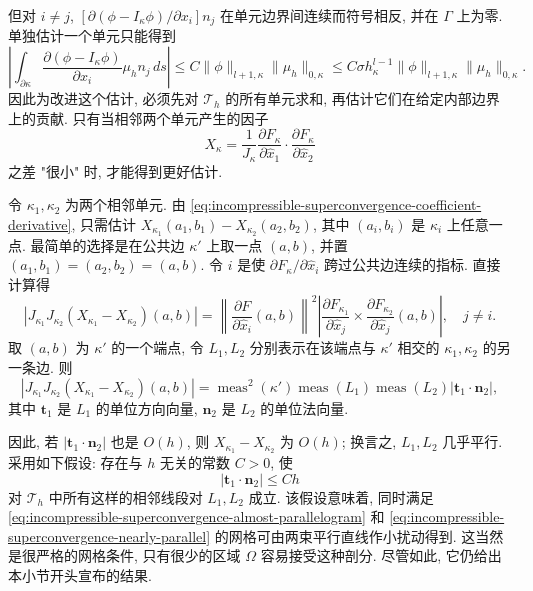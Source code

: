 但对 $i\ne j$,
$[\partial(\phi-I_\kappa\phi)/\partial x_i]n_j$
在单元边界间连续而符号相反, 并在 $\Gamma$ 上为零.
单独估计一个单元只能得到
\begin{equation}\label{eq:incompressible-superconvergence-crude-cross-bound}
\left|
\int_{\partial\kappa}
\frac{\partial(\phi-I_\kappa\phi)}{\partial x_i}
\mu_h n_j\,ds\right|
\leq C\|\phi\|_{l+1,\kappa}\|\mu_h\|_{0,\kappa}
\leq C\sigma h_\kappa^{l-1}
\|\phi\|_{l+1,\kappa}\|\mu_h\|_{0,\kappa}.
\end{equation}
因此为改进这个估计, 必须先对 $\mathcal T_h$ 的所有单元求和,
再估计它们在给定内部边界上的贡献.
只有当相邻两个单元产生的因子
\[
X_\kappa
=\frac1{J_\kappa}
\frac{\partial F_\kappa}{\partial\widehat x_1}
\cdot\frac{\partial F_\kappa}{\partial\widehat x_2}
\]
之差 "很小" 时, 才能得到更好估计.

令 $\kappa_1,\kappa_2$ 为两个相邻单元.
由 \eqref{eq:incompressible-superconvergence-coefficient-derivative},
只需估计
$X_{\kappa_1}(a_1,b_1)-X_{\kappa_2}(a_2,b_2)$,
其中 $(a_i,b_i)$ 是 $\kappa_i$ 上任意一点.
最简单的选择是在公共边 $\kappa'$ 上取一点 $(a,b)$,
并置 $(a_1,b_1)=(a_2,b_2)=(a,b)$.
令 $i$ 是使 $\partial F_{\kappa}/\partial\widehat x_i$
跨过公共边连续的指标. 直接计算得
\[
|J_{\kappa_1}J_{\kappa_2}
(X_{\kappa_1}-X_{\kappa_2})(a,b)|
=\left\|\frac{\partial F}{\partial\widehat x_i}(a,b)\right\|^2
\left|
\frac{\partial F_{\kappa_1}}{\partial\widehat x_j}
\times
\frac{\partial F_{\kappa_2}}{\partial\widehat x_j}(a,b)
\right|,
\quad j\ne i.
\]
取 $(a,b)$ 为 $\kappa'$ 的一个端点,
令 $L_1,L_2$ 分别表示在该端点与 $\kappa'$ 相交的
$\kappa_1,\kappa_2$ 的另一条边. 则
\begin{equation}\label{eq:incompressible-superconvergence-adjacent-geometry}
|J_{\kappa_1}J_{\kappa_2}
(X_{\kappa_1}-X_{\kappa_2})(a,b)|
=\operatorname{meas}^2(\kappa')
\operatorname{meas}(L_1)\operatorname{meas}(L_2)
|\mathbf t_1\cdot\mathbf n_2|,
\end{equation}
其中 $\mathbf t_1$ 是 $L_1$ 的单位方向向量,
$\mathbf n_2$ 是 $L_2$ 的单位法向量.

因此, 若 $|\mathbf t_1\cdot\mathbf n_2|$ 也是 $O(h)$,
则 $X_{\kappa_1}-X_{\kappa_2}$ 为 $O(h)$;
换言之, $L_1,L_2$ 几乎平行.
采用如下假设: 存在与 $h$ 无关的常数 $C>0$, 使
\begin{equation}\label{eq:incompressible-superconvergence-nearly-parallel}
|\mathbf t_1\cdot\mathbf n_2|\leq Ch
\end{equation}
对 $\mathcal T_h$ 中所有这样的相邻线段对 $L_1,L_2$ 成立.
该假设意味着, 同时满足
\eqref{eq:incompressible-superconvergence-almost-parallelogram}
和 \eqref{eq:incompressible-superconvergence-nearly-parallel}
的网格可由两束平行直线作小扰动得到.
这当然是很严格的网格条件, 只有很少的区域 $\Omega$
容易接受这种剖分. 尽管如此, 它仍给出本小节开头宣布的结果.

